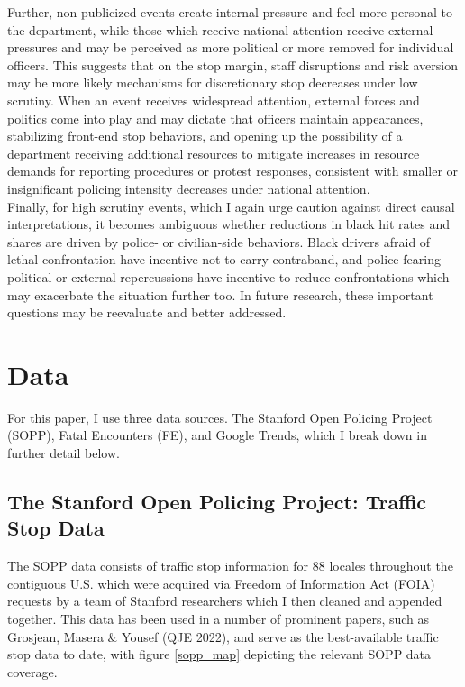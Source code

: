 Further, non-publicized events create internal pressure and feel more personal to the department, while those which receive national attention receive external pressures and may be perceived as more political or more removed for individual officers. This suggests that on the stop margin, staff disruptions and risk aversion may be more likely mechanisms for discretionary stop decreases under low scrutiny. When an event receives widespread attention, external forces and politics come into play and may dictate that officers maintain appearances, stabilizing front-end stop behaviors, and opening up the possibility of a department receiving additional resources to mitigate increases in resource demands for reporting procedures or protest responses, consistent with smaller or insignificant policing intensity decreases under national attention. \\

Finally, for high scrutiny events, which I again urge caution against direct causal interpretations, it becomes ambiguous whether reductions in black hit rates and shares are driven by police- or civilian-side behaviors. Black drivers afraid of lethal confrontation have incentive not to carry contraband, and police fearing political or external repercussions have incentive to reduce confrontations which may exacerbate the situation further too. In future research, these important questions may be reevaluate and better addressed. \\

\section{Data}
For this paper, I use three data sources. The Stanford Open Policing Project (SOPP), Fatal Encounters (FE), and Google Trends, which I break down in further detail below. \\

\subsection{The Stanford Open Policing Project: Traffic Stop Data}
The SOPP data consists of traffic stop information for 88 locales throughout the contiguous U.S. which were acquired via Freedom of Information Act (FOIA) requests by a team of Stanford researchers which I then cleaned and appended together. This data has been used in a number of prominent papers, such as Grosjean, Masera \& Yousef (QJE 2022), and serve as the best-available traffic stop data to date, with figure \ref{sopp_map} depicting the relevant SOPP data coverage. \\

